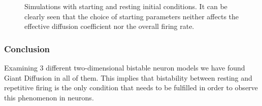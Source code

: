 \documentclass[12pt,a4paper]{article}
\begin{document}
\begin{figure}[H]
	\hspace*{-0.5cm}
	\caption{Simulations with starting and resting initial conditions. It can be clearly seen that the choice of starting parameters neither affects the effective diffusion coefficient nor the overall firing rate.}
	\label{icrinzel}
\end{figure}
\subsubsection{Conclusion}
Examining 3 different two-dimensional bistable neuron models we have found Giant Diffusion in all of them. This implies that bistability between resting and repetitive firing is the only condition that needs to be fulfilled in order to observe this phenomenon in neurons.
\end{document}

